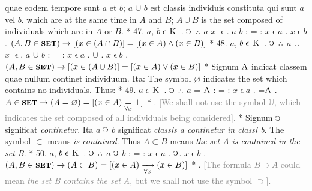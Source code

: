 \documentclass{book}
\newcommand{\C}{\mathop{\sbox0{$\displaystyle$$\reflectbox{C}$} %
\raisebox{-\height+\ht0-0.05cm}[\ht0][\dp0]{\scalebox{0.8}[0.8]{\copy0}}}\displaylimits} %
\newcommand{\pppNoSpace}{\leavevmode\lower0ex\hbox{.}\kern-0.1em\raise0.7ex\hbox{.}\kern-0.1em\lower0ex\hbox{.}} %
\newcommand{\abs}{\mathop{\rotatebox[origin=c]{180}{V}}}
\newcommand{\smallIn}{\ensuremath{\mathrel{\epsilon}}}
\newcommand{\K}{\mathop{\thinspace \text{K} \thinspace}}
\newcommand{\setOfSets}{\mathord{\text{{\footnotesize \textbf{SET}}}}}
\newcommand\irrelavent[1]{\textcolor{gray}{#1}}
\newenvironment{translateTwoCol}
               { %
                 \columnratio{0.5, 0.5} \begin{paracol}{2}
                 \newcommand{\LAT}{\switchcolumn[0]*}
                 \newcommand{\ENG}{\switchcolumn[1]}
               }
               { %
                 \let\ENG\undefined
                 \let\LAT\undefined
                 \end{paracol}
               }
\begin{document}
\begin{translateTwoCol}
quae eodem tempore sunt $a$ et $b$; $a$ $\cup$ $b$ est classis individuis constituta qui sunt $a$ vel $b$.
\ENG
which are at the same time in $A$ and $B$; $A \cup B$ is the set composed of individuals which are in $A$ or $B$.
\LAT
47. \hspace{0.67cm} $a$, $b \smallIn \K$ . $\C$ $\pppNoSpace$ $a$ $x$ \smallIn . $a$ $b$ : = : $x \smallIn a$ . $x \smallIn b$
\ENG
47. \hspace{0.67cm} $(A, B \in \setOfSets) \rightarrow [(x \in (A \cap B)] = [(x \in A) \wedge (x \in B)]$
\LAT
48. \hspace{0.67cm} $a$, $b \smallIn \K$ . $\C$ $\pppNoSpace$ $a$ $\cup$ $x$ \smallIn . $a$ $\cup$ $b$ : = : $x \smallIn a$ . $\cup$ . $x \smallIn b$
\ENG
48. \hspace{0.67cm} $(A, B \in \setOfSets) \rightarrow  [(x \in (A \cup B)] = [(x \in A) \vee (x \in B)]$
\LAT
\quad Signum $\abs$ indicat classem quae nullum continet individuum. Ita:
\ENG
\quad The symbol $\varnothing$ indicates the set which contains no individuals. Thus:
\LAT
49. \hspace{0.67cm} $a \smallIn \K$ . $\C$ $\pppNoSpace$ $a$ = $\abs$ : = : $x \smallIn a$ . =\scalebox{0.7}{$x$}\thinspace  $\abs$
\ENG
49. \hspace{0.67cm} $A \in \setOfSets \rightarrow (A= \varnothing) = [(x \in A) \underset{\forall x}= \bot]$ 
\LAT
{}.
\ENG
\quad \irrelavent{[We shall not use the symbol $\mathbb{U}$, which indicates the set composed of all individuals being considered].}
\LAT
\quad Signum $\C$ significat \emph{continetur}. Ita $a$ $\C$ $b$ significat \emph{classis a continetur in classi b}.
\ENG
\quad The symbol $\subset$ means \emph{is contained}. Thus $A \subset B$ means \emph{the set A is contained in the set B}.
\LAT
50. \hspace{0.67cm} $a$, $b \smallIn \K$ . $\C$ $\pppNoSpace$ $a$ $\C$ $b$ : = : $x \smallIn a$ . $\C$\scalebox{0.7}{$x$}\thinspace . $x \smallIn b$
\ENG
50. \hspace{0.67cm} $(A, B \in \setOfSets) \rightarrow (A \subset B)=[(x\in A) \xrightarrow[\forall x]{} (x \in B)]$
\LAT
{}.
\ENG
\quad \irrelavent{[The formula $B \supset A$ could mean \emph{the set B contains the set A}, but we shall not use the symbol $\supset$].}

\end{translateTwoCol}
\end{document}
